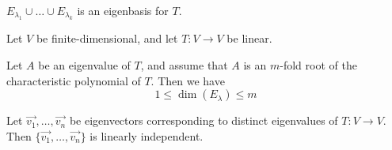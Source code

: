 \documentclass[11pt,fleqn]{book} %
\begin{document}
$E_{\lambda_1} \cup \dots \cup E_{\lambda_k}$ is an eigenbasis for $T$.

\setcounter{chapter}{4}
\setcounter{dummy}{5}
\begin{proposition}
    Let $V$ be finite-dimensional, and let $T: V \to V$ be linear.
    
    Let $A$ be an eigenvalue of $T$, and assume that $A$ is an $m$-fold root of the characteristic polynomial of $T$. Then we have $$1 \le \dim(E_\lambda) \le m$$
\end{proposition}

\setcounter{dummy}{3}
\begin{proposition}
    Let $\overrightarrow{v_1}, \dots, \overrightarrow{v_n}$ be eigenvectors corresponding to distinct eigenvalues of $T: V \to V$. Then $\{ \overrightarrow{v_1}, \dots, \overrightarrow{v_n} \}$  is linearly independent. 
\end{proposition}
\setcounter{chapter}{3}
\end{document}
